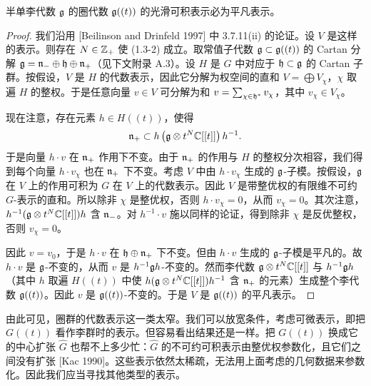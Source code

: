 \begin{lemma}\label{lem:u02-smooth-integrable}
    半单李代数 $\mathfrak{g}$ 的圈代数 $\mathfrak{g}((t))$ 的光滑可积表示必为平凡表示。
\end{lemma}

\begin{proof}
    我们沿用 [Beilinson and Drinfeld 1997] 中 3.7.11(ii) 的论证。设 $V$ 是这样的表示。则存在 $N\in\mathbb{Z}_+$ 使 (1.3-2) 成立。取常值子代数 $\mathfrak{g}\subset\mathfrak{g}((t))$ 的 Cartan 分解 $\mathfrak{g}=\mathfrak{n}_-\oplus\mathfrak{h}\oplus\mathfrak{n}_+$（见下文附录 A.3）。设 $H$ 是 $G$ 中对应于 $\mathfrak{h}\subset\mathfrak{g}$ 的 Cartan 子群。按假设，$V$ 是 $H$ 的代数表示，因此它分解为权空间的直和 $V=\bigoplus V_\chi$，$\chi$ 取遍 $H$ 的整权。于是任意向量 $v\in V$ 可分解为和 $v=\sum_{\chi\in\mathfrak{h}^*}v_\chi$，其中 $v_\chi\in V_\chi$。

    现在注意，存在元素 $h\in H((t))$，使得
    \[
        \mathfrak{n}_+\subset h\left(\mathfrak{g}\otimes t^N\mathbb{C}[[t]]\right)h^{-1}.
    \]
    于是向量 $h\cdot v$ 在 $\mathfrak{n}_+$ 作用下不变。由于 $\mathfrak{n}_+$ 的作用与 $H$ 的整权分次相容，我们得到每个向量 $h\cdot v_\chi$ 也在 $\mathfrak{n}_+$ 下不变。考虑 $V$ 中由 $h\cdot v_\chi$ 生成的 $\mathfrak{g}$-子模。按假设，$\mathfrak{g}$ 在 $V$ 上的作用可积为 $G$ 在 $V$ 上的代数表示。因此 $V$ 是带整优权的有限维不可约 $G$-表示的直和。所以除非 $\chi$ 是整优权，否则 $h\cdot v_\chi=0$，从而 $v_\chi=0$。其次注意，$h^{-1}(\mathfrak{g}\otimes t^N\mathbb{C}[[t]])h$ 含 $\mathfrak{n}_-$。对 $h^{-1}\cdot v$ 施以同样的论证，得到除非 $\chi$ 是反优整权，否则 $v_\chi=0$。

    因此 $v=v_0$，于是 $h\cdot v$ 在 $\mathfrak{h}\oplus\mathfrak{n}_+$ 下不变。但由 $h\cdot v$ 生成的 $\mathfrak{g}$-子模是平凡的。故 $h\cdot v$ 是 $\mathfrak{g}$-不变的，从而 $v$ 是 $h^{-1}\mathfrak{g} h$-不变的。然而李代数 $\mathfrak{g}\otimes t^N\mathbb{C}[[t]]$ 与 $h^{-1}\mathfrak{g} h$（其中 $h$ 取遍 $H((t))$ 中使 $h(\mathfrak{g}\otimes t^N\mathbb{C}[[t]])h^{-1}$ 含 $\mathfrak{n}_+$ 的元素）生成整个李代数 $\mathfrak{g}((t))$。因此 $v$ 是 $\mathfrak{g}((t))$-不变的。于是 $V$ 是 $\mathfrak{g}((t))$ 的平凡表示。
\end{proof}

由此可见，圈群的代数表示这一类太窄。我们可以放宽条件，考虑可微表示，即把 $G((t))$ 看作李群时的表示。但容易看出结果还是一样。把 $G((t))$ 换成它的中心扩张 $\widehat G$ 也帮不上多少忙：$\widehat G$ 的不可约可积表示由整优权参数化，且它们之间没有扩张 [Kac 1990]。这些表示依然太稀疏，无法用上面考虑的几何数据来参数化。因此我们应当寻找其他类型的表示。

